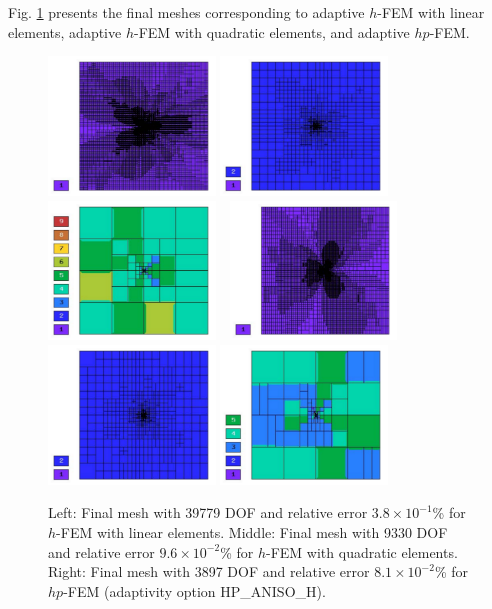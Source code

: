 \documentclass[12pt]{elsarticle}
\begin{document}
Fig. \ref{fig:nist-3-hp-aniso} presents the final meshes corresponding to adaptive $h$-FEM with
linear elements, adaptive $h$-FEM with quadratic elements, and adaptive $hp$-FEM.

\begin{figure}[!ht]
\centering
\includegraphics[height=3.7cm]{mafig15.pdf}
\includegraphics[height=3.7cm]{mafig16.pdf}
\includegraphics[height=3.7cm]{mafig17.pdf}\ \
\includegraphics[height=3.7cm]{mafig18.pdf}
\includegraphics[height=3.7cm]{mafig19.pdf}
\includegraphics[height=3.7cm]{mafig20.pdf}
\caption{
Left: Final mesh with 39779 DOF and relative error $3.8\times10^{-1}$\% for $h$-FEM with linear elements.
Middle: Final mesh with 9330 DOF and relative error $9.6\times10^{-2}$\% for $h$-FEM with quadratic elements.
Right: Final mesh with 3897 DOF and relative error $8.1\times10^{-2}$\% for $hp$-FEM (adaptivity option HP\_ANISO\_H).}
\label{fig:nist-3-hp-aniso}
\end{figure}
\end{document}
